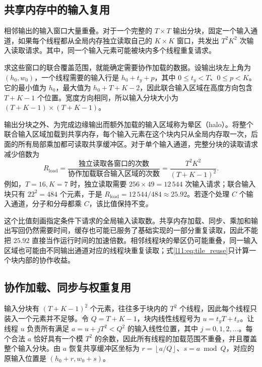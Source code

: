 \subsection{共享内存中的输入复用}
\label{l11:subsec:shared_memory}

相邻输出的输入窗口大量重叠。对于一个完整的 $T\times T$ 输出分块，固定一个输入通道，如果每个线程都从全局内存独立读取自己的 $K\times K$ 窗口，共发出 $T^2K^2$ 次输入读取请求。其中，同一个输入元素可能被块内多个线程重复请求。

求这些窗口的联合覆盖范围，就能确定需要协作加载的数据。设输出块左上角为 $(h_0,w_0)$，一个线程需要的输入行是 $h_0+t_y+p$，其中 $0\le t_y<T$、$0\le p<K$。它的最小值为 $h_0$，最大值为 $h_0+T+K-2$，因此联合输入区域在高度方向包含 $T+K-1$ 个位置。宽度方向相同，所以输入分块大小为 $(T+K-1)\times(T+K-1)$。

输出分块之外、为完成边缘输出而额外加载的输入区域称为晕区（halo）。将整个联合输入区域加载到共享内存，每个输入元素在这个块内只从全局内存取一次，后面的所有局部乘加都可读取共享缓冲区。对于单个输入通道，完整分块的读取请求减少倍数为
\begin{equation}
  R_{\mathrm{load}}
  =\frac{\text{独立读取各窗口的次数}}{\text{协作加载联合输入区域的次数}}
  =\frac{T^2K^2}{(T+K-1)^2}.
  \label{l11:eq:tile_reuse}
\end{equation}
例如，$T=16,K=7$ 时，独立读取需要 $256\times49=12\,544$ 次输入请求；联合输入块只有 $22^2=484$ 个元素，于是 $R_{\mathrm{load}}=12\,544/484\approx25.92$。若逐个处理 $C$ 个输入通道，分子和分母都乘 $C$，该比值保持不变。

这个比值刻画指定条件下请求的全局输入读取数。共享内存加载、同步、乘加和输出写回仍然需要时间，缓存也可能已服务了基础实现的一部分重复读取，因此不能把 $25.92$ 直接当作运行时间的加速倍数。相邻线程块的晕区仍可能重叠，同一输入区域也可能由不同输出通道对应的线程块重复读取；式\eqref{l11:eq:tile_reuse}只计算一个块内部的协作收益。

\subsection{协作加载、同步与权重复用}
\label{l11:subsec:cooperation}

输入分块有 $(T+K-1)^2$ 个元素，往往多于块内的 $T^2$ 个线程，因此每个线程只装入一个元素并不足够。令 $Q=T+K-1$，块内线性线程号为 $u=t_yT+t_x$。让线程 $u$ 负责所有满足 $a=u+jT^2<Q^2$ 的输入线性位置，其中 $j=0,1,2,\ldots$。每个合法 $a$ 恰好具有一个模 $T^2$ 的余数，因此所有线程的加载范围不重叠，并且覆盖整个输入分块。由 $a$ 恢复共享缓冲区坐标为 $r=\left\lfloor a/Q\right\rfloor$、$s=a\bmod Q$，对应的原输入位置是 $(h_0+r,w_0+s)$。

